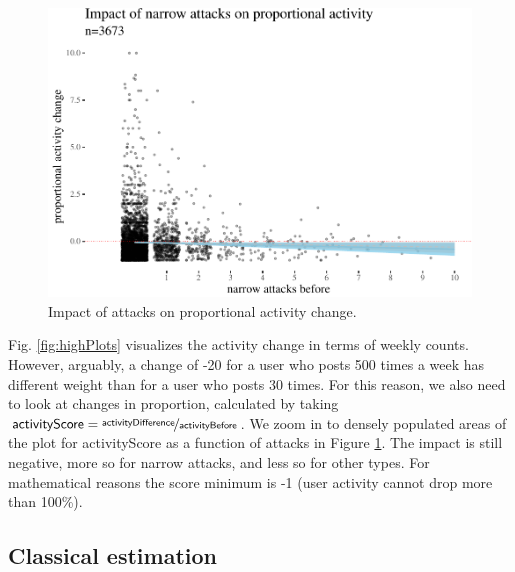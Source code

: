 \documentclass[
  10pt,
  dvipsnames]{scrartcl}
\begin{document}
\begin{figure}[H]

\begin{center}\includegraphics[width=1\linewidth]{quittingShortAbridgedRevisions3_files/figure-latex/unnamed-chunk-7-1} \end{center}
\caption{Impact of attacks  on proportional activity change.}
\label{fig:propActivity}
\end{figure}

Fig. \ref{fig:highPlots} visualizes the activity change in terms of
weekly counts. However, arguably, a change of -20 for a user who posts
500 times a week has different weight than for a user who posts 30
times. For this reason, we also need to look at changes in proportion,
calculated by taking
\(\mathsf{activityScore} = \nicefrac{\mathsf{activityDifference}}{\mathsf{activityBefore}}\).
We zoom in to densely populated areas of the plot for
\textsf{activityScore} as a function of attacks in Figure
\ref{fig:propActivity}. The impact is still negative, more so for
\textsf{narrow} attacks, and less so for other types. For mathematical
reasons the score minimum is -1 (user activity cannot drop more than
100\%).

\subsection{Classical estimation}
\end{document}
